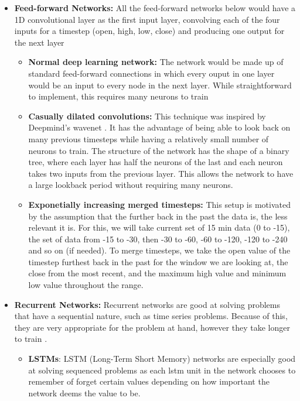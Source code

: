         \begin{itemize}

            \item \textbf{Feed-forward Networks:} All the feed-forward networks below would have a 1D convolutional layer as the first input layer, convolving each of the four inputs for a timestep (open, high, low, close) and producing one output for the next layer

            \begin{itemize}
                    
                \item \textbf{Normal deep learning network:} The network would be made up of standard feed-forward connections in which every ouput in one layer would be an input to every node in the next layer. While straightforward to implement, this requires many neurons to train 

                \item \textbf{Casually dilated convolutions:} This technique was inspired by Deepmind's wavenet \cite{wavenet}. It has the advantage of being able to look back on many previous timesteps while having a relatively small number of neurons to train. The structure of the network has the shape of a binary tree, where each layer has half the neurons of the last and each neuron takes two inputs from the previous layer. This allows the network to have a large lookback period without requiring many neurons.
            
                \item \textbf{Exponetially increasing merged timesteps:} This setup is motivated by the assumption that the further back in the past the data is, the less relevant it is. For this, we will take current set of 15 min data (0 to -15), the set of data from -15 to -30, then -30 to -60, -60 to -120, -120 to -240 and so on (if needed). To merge timesteps, we take the open value of the timestep furthest back in the past for the window we are looking at, the close from the most recent, and the maximum high value and minimum low value throughout the range. 
            
            \end{itemize}

            \item \textbf{Recurrent Networks:} Recurrent networks are good at solving problems that have a sequential nature, such as time series problems. Because of this, they are very appropriate for the problem at hand, however they take longer to train \cite{wavenet}.
            
            \begin{itemize}

                \item \textbf{LSTMs}: LSTM (Long-Term Short Memory) networks are especially good at solving sequenced problems as each lstm unit in the network chooses to remember of forget certain values depending on how important the network deems the value to be.
                
            \end{itemize}

        \end{itemize}

